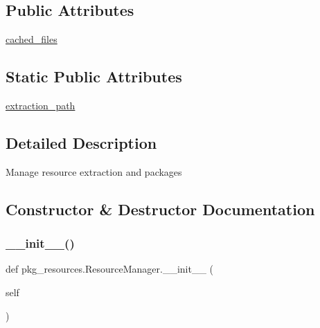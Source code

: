 \subsection*{Public Attributes}
\begin{DoxyCompactItemize}
\item 
\hyperlink{classpkg__resources_1_1ResourceManager_a73e8a505d671a5662efa4f9213a32c32}{cached\+\_\+files}
\end{DoxyCompactItemize}
\subsection*{Static Public Attributes}
\begin{DoxyCompactItemize}
\item 
\hyperlink{classpkg__resources_1_1ResourceManager_a6120904625d6624b7ecae0f9175ea9dd}{extraction\+\_\+path}
\end{DoxyCompactItemize}


\subsection{Detailed Description}
\begin{DoxyVerb}Manage resource extraction and packages\end{DoxyVerb}
 

\subsection{Constructor \& Destructor Documentation}
\mbox{\label{classpkg__resources_1_1ResourceManager_a9673742b6f33a0e9e50964d778d88147}} 
\subsubsection{\texorpdfstring{\+\_\+\+\_\+init\+\_\+\+\_\+()}{\_\_init\_\_()}}
{\footnotesize\ttfamily def pkg\+\_\+resources.\+Resource\+Manager.\+\_\+\+\_\+init\+\_\+\+\_\+ (\begin{DoxyParamCaption}\item[{}]{self }\end{DoxyParamCaption})}



